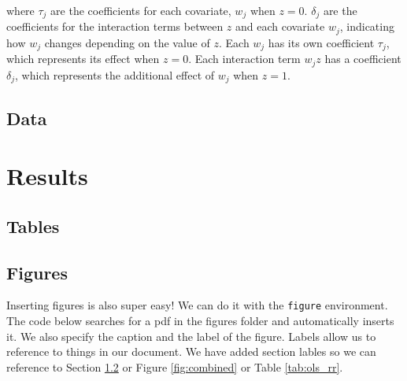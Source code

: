 \documentclass{article}
\begin{document}

where $\tau_{j}$ are the coefficients for each covariate, $w_{j}$ when $z = 0$. $\delta_{j}$ are the coefficients for the interaction terms between $z$ and each covariate $w_{j}$, indicating how $w_j$ changes depending on the value of $z$. Each $w_{j}$ has its own coefficient $\tau_{j}$, which represents its effect when $z = 0$. Each interaction term $w_{j} z$ has a coefficient $\delta_j$, which represents the additional effect of $w_{j}$ when $z = 1$.

\subsection{Data}
\label{sec:data}


\newpage
\section{Results}
\label{sec:results}


\subsection{Tables}
\label{sec:tables}

    


    

\newpage
\subsection{Figures}
\label{sec:figures}


Inserting figures is also super easy! We can do it with the \texttt{figure} environment. The code below searches for a pdf in the figures folder and automatically inserts it. We also specify the caption and the label of the figure. Labels allow us to reference to things in our document. We have added section lables so we can reference to Section \ref{sec:figures} or Figure \ref{fig:combined} or Table \ref{tab:ols_rr}. 
\end{document}
